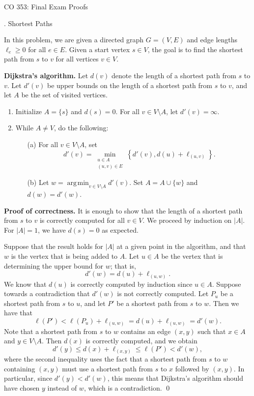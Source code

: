 \documentclass{article}
\DeclareMathOperator*{\argmin}{\arg\!\min}
\begin{document}
\begin{center}
    {\sc \Large CO 353: Final Exam Proofs}
\end{center}

\begin{center} {. Shortest Paths} \end{center}

In this problem, we are given a directed graph $G = (V, E)$ and edge lengths 
$\ell_e \geq 0$ for all $e \in E$. Given a start vertex $s \in V$, the 
goal is to find the shortest path from $s$ to $v$ for all vertices $v \in V$.  

{\color{violet}
{\bf Dijkstra's algorithm.} Let 
$d(v)$ denote the length of a shortest path from $s$ to $v$. Let 
$d'(v)$ be upper bounds on the length of a shortest path from $s$ to $v$,
and let $A$ be the set of visited vertices. 
\begin{enumerate}
    \item Initialize $A = \{s\}$ and $d(s) = 0$. For all 
    $v \in V \setminus A$, let $d'(v) = \infty$. 
    \item While $A \neq V$, do the following: 
    \begin{enumerate}
        \item [(a)] For all $v \in V \setminus A$, set 
        \[ d'(v) = \min_{\substack{u \in A \\ (u, v) \in E}} 
        \left\{ d'(v), d(u) + \ell_{(u, v)} \right\}. \] 
        \item [(b)] Let $w = \argmin_{v \in V \setminus A} d'(v)$. 
        Set $A = A \cup \{w\}$ and $d(w) = d'(w)$. 
    \end{enumerate}
\end{enumerate}}

{\color{blue}
{\bf Proof of correctness.} It is enough to show that the length of a 
shortest path from $s$ to $v$ is correctly computed for all $v \in V$. 
We proceed by induction on $|A|$. For $|A| = 1$, we have $d(s) = 0$ as expected. 

Suppose that the result holds for $|A|$ at a given point in the algorithm, 
and that $w$ is the vertex that is being added to $A$. Let $u \in A$ 
be the vertex that is determining the upper bound for $w$; that is, 
\[ d'(w) = d(u) + \ell_{(u, w)}. \] 
We know that $d(u)$ is correctly computed by induction since $u \in A$. Suppose towards a 
contradiction that $d'(w)$ is not correctly computed. Let 
$P_u$ be a shortest path from $s$ to $u$, and let $P'$ be a shortest 
path from $s$ to $w$. Then we have that 
\[ \ell(P') < \ell(P_u) + \ell_{(u, w)} = d(u) + \ell_{(u, w)} = d'(w). \] 
Note that a shortest path from $s$ to $w$ contains an edge $(x, y)$ such that 
$x \in A$ and $y \in V \setminus A$. Then $d(x)$ is correctly computed, and we obtain 
\[ d'(y) \leq d(x) + \ell_{(x,y)} \leq \ell(P') < d'(w), \] 
where the second inequality uses the fact that a shortest path from $s$ to $w$ 
containing $(x, y)$ must use a shortest path from $s$ to $x$ followed by 
$(x, y)$. In particular, since $d'(y) < d'(w)$, this means that Dijkstra's 
algorithm should have chosen $y$ instead of $w$, which is a contradiction. \qed}
\end{document}
